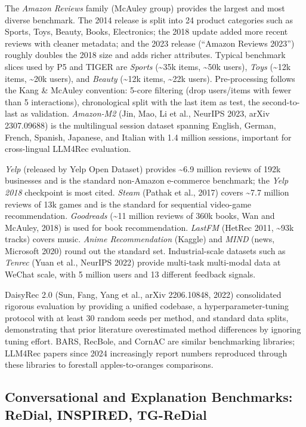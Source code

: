 The \emph{Amazon Reviews} family (McAuley group) provides the largest and most diverse benchmark. The 2014 release is split into 24 product categories such as Sports, Toys, Beauty, Books, Electronics; the 2018 update added more recent reviews with cleaner metadata; and the 2023 release (``Amazon Reviews 2023'') roughly doubles the 2018 size and adds richer attributes. Typical benchmark slices used by P5 and TIGER are \emph{Sports} (\textasciitilde35k items, \textasciitilde50k users), \emph{Toys} (\textasciitilde12k items, \textasciitilde20k users), and \emph{Beauty} (\textasciitilde12k items, \textasciitilde22k users). Pre-processing follows the Kang \& McAuley convention: 5-core filtering (drop users/items with fewer than 5 interactions), chronological split with the last item as test, the second-to-last as validation. \emph{Amazon-M2} (Jin, Mao, Li et al., NeurIPS 2023, arXiv 2307.09688) is the multilingual session dataset spanning English, German, French, Spanish, Japanese, and Italian with 1.4 million sessions, important for cross-lingual LLM4Rec evaluation.

\emph{Yelp} (released by Yelp Open Dataset) provides \textasciitilde6.9 million reviews of 192k businesses and is the standard non-Amazon e-commerce benchmark; the \emph{Yelp 2018} checkpoint is most cited. \emph{Steam} (Pathak et al., 2017) covers \textasciitilde7.7 million reviews of 13k games and is the standard for sequential video-game recommendation. \emph{Goodreads} (\textasciitilde11 million reviews of 360k books, Wan and McAuley, 2018) is used for book recommendation. \emph{LastFM} (HetRec 2011, \textasciitilde93k tracks) covers music. \emph{Anime Recommendation} (Kaggle) and \emph{MIND} (news, Microsoft 2020) round out the standard set. Industrial-scale datasets such as \emph{Tenrec} (Yuan et al., NeurIPS 2022) provide multi-task multi-modal data at WeChat scale, with 5 million users and 13 different feedback signals.

DaisyRec 2.0 (Sun, Fang, Yang et al., arXiv 2206.10848, 2022) consolidated rigorous evaluation by providing a unified codebase, a hyperparameter-tuning protocol with at least 30 random seeds per method, and standard data splits, demonstrating that prior literature overestimated method differences by ignoring tuning effort. BARS, RecBole, and CornAC are similar benchmarking libraries; LLM4Rec papers since 2024 increasingly report numbers reproduced through these libraries to forestall apples-to-oranges comparisons.

\subsection{Conversational and Explanation Benchmarks: ReDial, INSPIRED, TG-ReDial}\label{conversational-and-explanation-benchmarks-redial-inspired-tg-redial}

